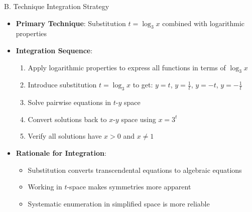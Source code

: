 \documentclass[12pt]{article}
\begin{document}
\begin{conversionbox}{B. Technique Integration Strategy}
\begin{itemize}[leftmargin=*]
    \item \textbf{Primary Technique}: Substitution $t = \log_3 x$ combined with logarithmic properties
    
    \item \textbf{Integration Sequence}:
    \begin{enumerate}
        \item Apply logarithmic properties to express all functions in terms of $\log_3 x$
        \item Introduce substitution $t = \log_3 x$ to get: $y = t$, $y = \frac{1}{t}$, $y = -t$, $y = -\frac{1}{t}$
        \item Solve pairwise equations in $t$-$y$ space
        \item Convert solutions back to $x$-$y$ space using $x = 3^t$
        \item Verify all solutions have $x > 0$ and $x \neq 1$
    \end{enumerate}
    
    \item \textbf{Rationale for Integration}:
    \begin{itemize}
        \item Substitution converts transcendental equations to algebraic equations
        \item Working in $t$-space makes symmetries more apparent
        \item Systematic enumeration in simplified space is more reliable
    \end{itemize}
\end{itemize}
\end{conversionbox}
\end{document}
